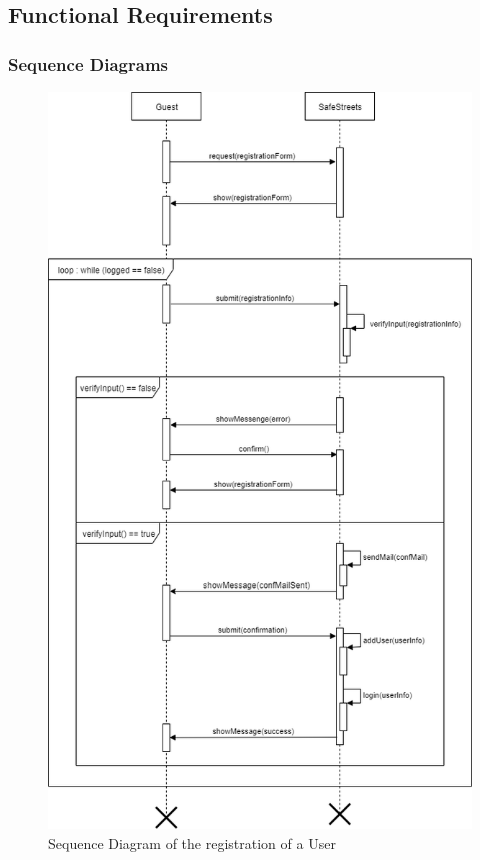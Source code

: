 \subsection{Functional Requirements}

    \subsubsection{Sequence Diagrams}
    
    \begin{figure}[h]
        \centering
        \includegraphics[scale=0.5]{Images/SeqDiag_registration.png}
        \caption{Sequence Diagram of the registration of a User}
    \end{figure}
    

